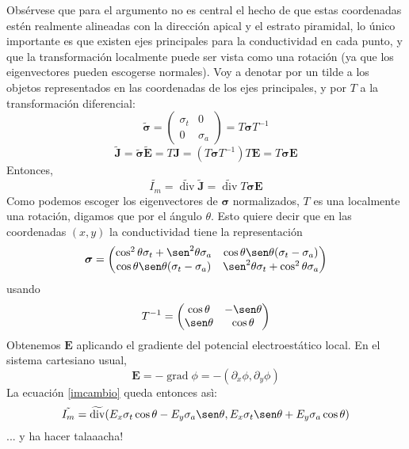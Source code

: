 \documentclass{article}
\newcommand{\Jd}{\mathbf{J}}
\newcommand{\EF}{\mathbf{E}}
\newcommand{\cond}{\boldsymbol{\sigma}}
\DeclareMathOperator{\diver}{div}
\DeclareMathOperator{\grad}{grad}
\begin{document}
Obsérvese que para el argumento no es central el hecho de que estas coordenadas
estén realmente alineadas con la dirección apical y el estrato piramidal, 
lo único importante es que existen ejes
principales para la conductividad en cada punto, y que la transformación
localmente puede ser vista como una rotación (ya que los eigenvectores pueden
escogerse normales). Voy  a denotar por un tilde a los objetos representados
en las coordenadas de los ejes principales, y por $T$ 
a la transformación diferencial:
\begin{equation}
\tilde{\cond}=
\begin{pmatrix}
\sigma_{t} & 0 \\
0 & \sigma_{a}
\end{pmatrix} = T \cond T^{-1}
\end{equation}
\begin{equation}
  \tilde{\Jd} = \tilde{\cond}\tilde{\EF}= T\Jd= (T \cond T^{-1}) T \EF = T\cond \EF
\end{equation}
Entonces,
\begin{equation}\label{imcambio}
\tilde{I_m} = \widetilde{\diver} \tilde{\Jd} = \widetilde{\diver} T\cond \EF
\end{equation}
Como podemos escoger los eigenvectores de $\cond$ normalizados, $T$ es 
una localmente una rotación, digamos que por el ángulo $\theta$. Esto quiere
decir que en las coordenadas $(x,y)$ la conductividad tiene la 
representación
\begin{equation}
\cond=
\begin{pmatrix}
\cos^2 \theta \sigma_t+\sen^2 \theta \sigma_a & \cos\theta \sen\theta (\sigma_t-\sigma_a) \\
\cos\theta \sen\theta (\sigma_t-\sigma_a) &\sen^2 \theta \sigma_t+\cos^2 \theta \sigma_a
\end{pmatrix} 
\end{equation}
usando
\begin{equation}
T^{-1}=
\begin{pmatrix}
\cos \theta  & - \sen\theta \\
\sen\theta  &\cos \theta 
\end{pmatrix} 
\end{equation}
Obtenemos $\EF$ aplicando el gradiente del potencial electroestático local. 
En el sistema cartesiano usual,
\begin{equation}
\EF=-\grad \phi=-(\partial_x \phi, \partial_y \phi)
\end{equation}
La ecuación \ref{imcambio} queda entonces asì:
\begin{equation}\label{imcambio}
\tilde{I_m} = \widetilde{\diver} 
(E_x\sigma_t \cos\theta - E_y \sigma_a \sen \theta,
E_x\sigma_t \sen\theta + E_y \sigma_a \cos \theta)
\end{equation}
... y ha hacer talaaacha!





 



\end{document}
